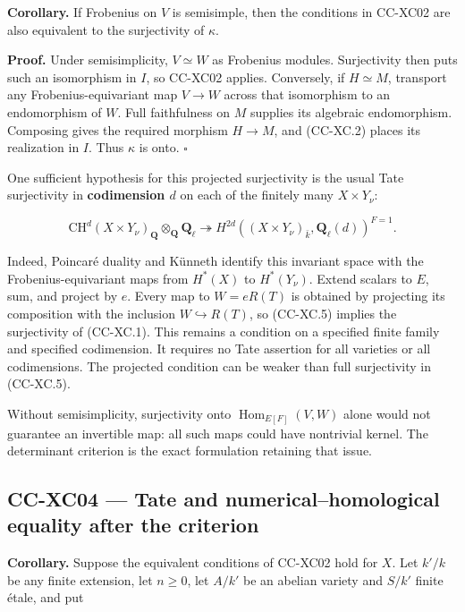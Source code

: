\documentclass[11pt,a4paper]{article}
\theoremstyle{definition}\newtheorem{definition}[theorem]{Definition}
\theoremstyle{remark}\newtheorem{remark}[theorem]{Remark}
\begin{document}
\textbf{Corollary.} If Frobenius on \(V\) is semisimple, then the
conditions in CC-XC02 are also equivalent to the surjectivity of
\(\kappa\).

\textbf{Proof.} Under semisimplicity, \(V\simeq W\) as Frobenius
modules. Surjectivity then puts such an isomorphism in \(I\), so CC-XC02
applies. Conversely, if \(H\simeq M\), transport any
Frobenius-equivariant map \(V\to W\) across that isomorphism to an
endomorphism of \(W\). Full faithfulness on \(M\) supplies its algebraic
endomorphism. Composing gives the required morphism \(H\to M\), and
(CC-XC.2) places its realization in \(I\). Thus \(\kappa\) is onto.
\(\square\)

One sufficient hypothesis for this projected surjectivity is the usual
Tate surjectivity in \textbf{codimension \(d\)} on each of the finitely
many \(X\times Y_\nu\):

\[
 \mathrm{CH}^d(X\times Y_\nu)_{\mathbf Q}
       \otimes_{\mathbf Q}\mathbf Q_\ell
 \twoheadrightarrow
 H^{2d}((X\times Y_\nu)_{\bar k},\mathbf Q_\ell(d))^{F=1}.
                                                        \tag{CC-XC.5}
\]

Indeed, Poincaré duality and Künneth identify this invariant space with
the Frobenius-equivariant maps from \(H^*(X)\) to \(H^*(Y_\nu)\). Extend
scalars to \(E\), sum, and project by \(e\). Every map to \(W=eR(T)\) is
obtained by projecting its composition with the inclusion
\(W\hookrightarrow R(T)\), so (CC-XC.5) implies the surjectivity of
(CC-XC.1). This remains a condition on a specified finite family and
specified codimension. It requires no Tate assertion for all varieties
or all codimensions. The projected condition can be weaker than full
surjectivity in (CC-XC.5).

Without semisimplicity, surjectivity onto
\(\operatorname{Hom}_{E[F]}(V,W)\) alone would not guarantee an
invertible map: all such maps could have nontrivial kernel. The
determinant criterion is the exact formulation retaining that issue.

\subsection{CC-XC04 --- Tate and numerical--homological equality after
the
criterion}\label{cc-xc04-tate-and-numericalhomological-equality-after-the-criterion}

\textbf{Corollary.} Suppose the equivalent conditions of CC-XC02 hold
for \(X\). Let \(k'/k\) be any finite extension, let \(n\ge0\), let
\(A/k'\) be an abelian variety and \(S/k'\) finite étale, and put
\end{document}
